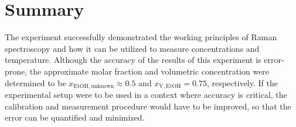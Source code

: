 
\chapter{Summary}
\label{chap:summary}

The experiment successfully demonstrated the working principles of Raman spectroscopy and how it can be utilized to measure concentrations and temperature. Although the accuracy of the results of this experiment is error-prone, the approximate molar fraction and volumetric concentration were determined to be $x_\mathrm{EtOH,unknown} \approx 0.5$ and $x_\mathrm{V,EtOH}=0.75$, respectively. If the experimental setup were to be used in a context where accuracy is critical, the calibration and measurement procedure would have to be improved, so that the error can be quantified and minimized.